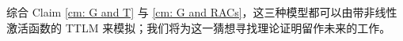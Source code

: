 综合 Claim \ref{cm: G and T} 与 \ref{cm: G and RACs}，这三种模型都可以由带非线性激活函数的 TTLM 来模拟；我们将为这一猜想寻找理论证明留作未来的工作。








